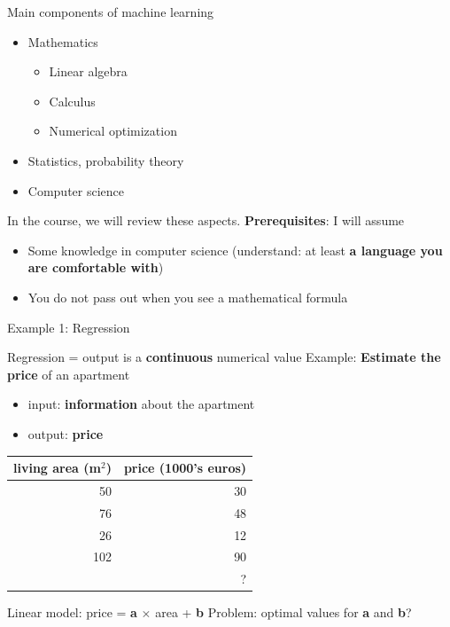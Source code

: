 \documentclass{beamer}
\begin{document}
\begin{frame}{Main components of machine learning}
\vfill
\begin{itemize}
\item Mathematics
	\begin{itemize}
		\item Linear algebra
		\item Calculus
		\item Numerical optimization
	\end{itemize}
\vfill
\item Statistics, probability theory
\vfill
\item Computer science
\end{itemize}
\vfill
\pause
In the course, we will review these aspects.
\vfill
\textbf{Prerequisites}: I will assume
\begin{itemize}
	\item Some knowledge in computer science (understand: at least \textbf{a language you are comfortable with})
	\item You do not pass out when you see a mathematical formula
\end{itemize}
\vfill
\end{frame}

\begin{frame}{Example 1: Regression}

Regression = output is a \textbf{continuous} numerical value
\vfill
Example: \textbf{Estimate the price} of an apartment
\begin{itemize}
	\item input: \textbf{information} about the apartment
	\item output: \textbf{price}
\end{itemize}
\vfill
\pause
\begin{table}
\centering
\begin{tabular}{r|r}
living area (m$^2$) & price (1000's euros) \\\hline
50 & 30 \\
76 & 48 \\
26 & 12 \\
102 & 90 \\
\pause
61 & ?
\end{tabular}
\end{table}
\vfill
Linear model: price = \textbf{a} $\times$ area + \textbf{b}
\vfill
Problem: optimal values for \textbf{a} and \textbf{b}?

\end{frame}
\end{document}
